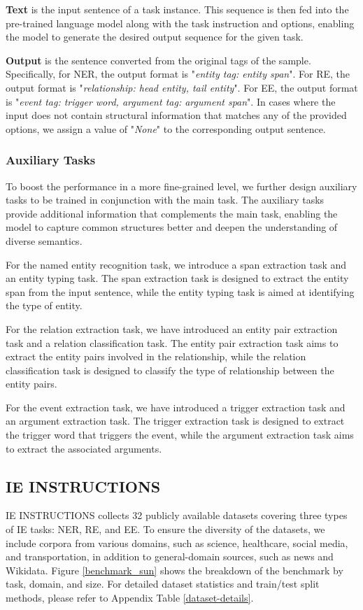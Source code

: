 \textbf{Text} is the input sentence of a task instance. This sequence is then fed into the pre-trained language model along with the task instruction and options, enabling the model to generate the desired output sequence for the given task.

\textbf{Output} is the sentence converted from the original tags of the sample. Specifically, for NER, the output format is "\textit{entity tag: entity span}". For RE, the output format is "\textit{relationship: head entity, tail entity}". For EE, the output format is "\textit{event tag: trigger word, argument tag: argument span}". In cases where the input does not contain structural information that matches any of the provided options, we assign a value of "\textit{None}" to the corresponding output sentence.

\subsubsection{Auxiliary Tasks}
To boost the performance in a more fine-grained level, we further design auxiliary tasks to be trained in conjunction with the main task. The auxiliary tasks provide additional information that complements the main task, enabling the model to capture common structures better and deepen the understanding of diverse semantics.

For the named entity recognition task, we introduce a span extraction task and an entity typing task. The span extraction task is designed to extract the entity span from the input sentence, while the entity typing task is aimed at identifying the type of entity.

For the relation extraction task, we have introduced an entity pair extraction task and a relation classification task. The entity pair extraction task aims to extract the entity pairs involved in the relationship, while the relation classification task is designed to classify the type of relationship between the entity pairs.

For the event extraction task, we have introduced a trigger extraction task and an argument extraction task. The trigger extraction task is designed to extract the trigger word that triggers the event, while the argument extraction task aims to extract the associated arguments.

\subsection{IE INSTRUCTIONS}
IE INSTRUCTIONS collects 32 publicly available datasets covering three types of IE tasks: NER, RE, and EE. To ensure the diversity of the datasets, we include corpora from various domains, such as science, healthcare, social media, and transportation, in addition to general-domain sources, such as news and Wikidata. Figure \ref{benchmark_sun} shows the breakdown of the benchmark by task, domain, and size. For detailed dataset statistics and train/test split methods, please refer to Appendix Table \ref{dataset-details}.

